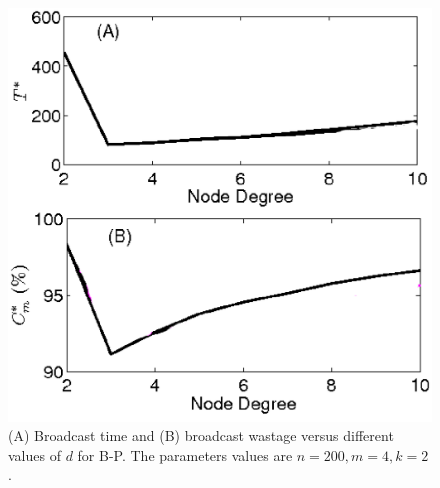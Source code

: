 \begin{figure}
\centering
\includegraphics[scale=0.4]{./texfiles/Chapter_3/netsci/figs1/DiffTopologyRegularTree_delay_cost_N200_m4_k2_varyD_ps_plRes1.eps}
\caption{(A) Broadcast time and (B) broadcast wastage versus different values of $d$ for B-P. The parameters values are $n=200, m=4, k=2$.\vspace{4mm}}
\label{DiffTopologyTree_N200_varyD_push_pull}
\end{figure}

